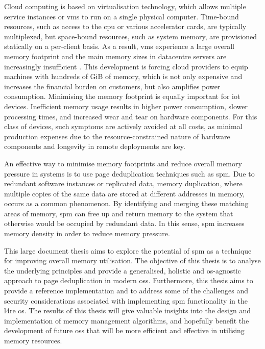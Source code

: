 Cloud computing is based on virtualisation technology, which allows multiple service instances or \acp{vm} to run on a single physical computer.
Time-bound resources, such as access to the \ac{cpu} or various accelerator cards, are typically multiplexed, but space-bound resources, such as system memory, are provisioned statically on a per-client basis.
As a result, \acp{vm} experience a large overall memory footprint and the main memory sizes in datacentre servers are increasingly insufficient \cite{de2008}.
This development is forcing cloud providers to equip machines with hundreds of GiB of memory, which is not only expensive and increases the financial burden on customers, but also amplifies power consumption.
Minimising the memory footprint is equally important for \Ac{iot} devices.
Inefficient memory usage results in higher power consumption, slower processing times, and increased wear and tear on hardware components.
For this class of devices, such symptoms are actively avoided at all costs, as minimal production expenses due to the resource-constrained nature of hardware components and longevity in remote deployments are key.

An effective way to minimise memory footprints and reduce overall memory pressure in systems is to use page deduplication techniques such as \ac{spm}.
Due to redundant software instances or replicated data, memory duplication, where multiple copies of the same data are stored at different addresses in memory, occurs as a common phenomenon.
By identifying and merging these matching areas of memory, \ac{spm} can free up and return memory to the system that otherwise would be occupied by redundant data.
In this sense, \ac{spm} increases memory density in order to reduce memory pressure.

This large document thesis aims to explore the potential of \ac{spm} as a technique for improving overall memory utilisation.
The objective of this thesis is to analyse the underlying principles and provide a generalised, holistic and \ac{os}-agnostic approach to page deduplication in modern \acp{os}.
Furthermore, this thesis aims to provide a reference implementation and to address some of the challenges and security considerations associated with implementing \ac{spm} functionality in the \ac{l4re} \ac{os}.
The results of this thesis will give valuable insights into the design and implementation of memory management algorithms, and hopefully benefit the development of future \acp{os} that will be more efficient and effective in utilising memory resources.
